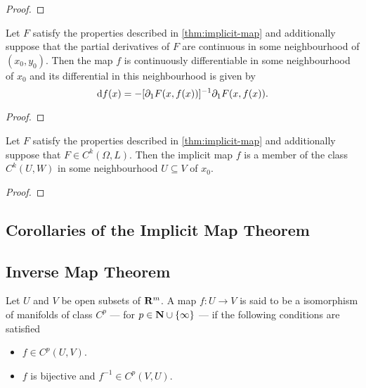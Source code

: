 \begin{proof}

\end{proof}

\begin{lemma}
  \label{lem:continuous-diff-implicit-map}
  Let \(F\) satisfy the properties described in \cref{thm:implicit-map} and
  additionally suppose that the partial derivatives of \(F\) are continuous in
  some neighbourhood of \((x_0, y_0)\). Then the map \(f\) is continuously
  differentiable in some neighbourhood of \(x_0\) and its differential in this
  neighbourhood is given by
  \[
    \mathrm{d} f(x) = - [\partial_1F(x, f(x))]^{-1} \partial_1F(x, f(x)).
  \]
\end{lemma}

\begin{proof}

\end{proof}

\begin{lemma}
  \label{lem:Ck-implicit-map}
  Let \(F\) satisfy the properties described in \cref{thm:implicit-map} and
  additionally suppose that \(F \in C^k(\Omega, L)\). Then the implicit map \(f\) is
  a member of the class \(C^k(U, W)\) in some neighbourhood \(U \subseteq V\) of \(x_0\).
\end{lemma}

\begin{proof}

\end{proof}


\subsection{Corollaries of the Implicit Map Theorem}

\subsection{Inverse Map Theorem}

\begin{definition}
  \label{def:diffeormorphism-on-R}
  Let \(U\) and \(V\) be open subsets of \(\mathbf{R}^m\). A map \(f: U \to V\) is said to
  be a isomorphism of manifolds of class \(C^p\) --- for \(p \in \mathbf{N} \cup \{\infty\}\) --- if the
  following conditions are satisfied
  \begin{itemize}\setlength\itemsep{0em}
    \item \(f \in C^p(U, V)\).
    \item \(f\) is bijective and \(f^{-1} \in C^p(V, U)\).
  \end{itemize}
\end{definition}

